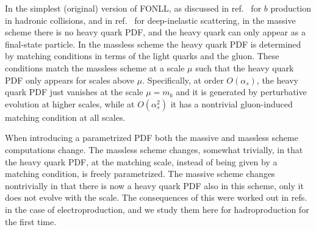 In the simplest (original) version of  FONLL, as discussed
in ref.~\cite{Cacciari:1998it} for $b$ production in hadronic
collisions, and in ref.~\cite{Forte:2010ta} for deep-inelastic
scattering, in the massive scheme there is no heavy quark PDF, and the
 heavy quark can only appear as a final-state particle. In the
 massless scheme the heavy quark PDF is determined by matching
 conditions in terms of the light quarks and the gluon. These
 conditions match the massless scheme at a scale $\mu$ such that the
 heavy quark PDF only appears for scales above $\mu$. Specifically,
 at order $O(\alpha_s)$, the heavy quark PDF just vanishes
 at the scale 
 $\mu=m_b$
 and it is
 generated by perturbative evolution at higher scales, while at
 $O(\alpha^2_s)$ it has a nontrivial gluon-induced matching condition
 at all scales.

 When introducing a parametrized PDF both the massive and massless
 scheme computations change. The massless scheme changes, somewhat
 trivially,
 in that the
 heavy quark PDF, at the matching scale, instead of being given by a
 matching condition,  is freely parametrized. The massive scheme
 changes nontrivially in that there is now a heavy quark PDF also in
 this scheme, 
only it does not evolve with the scale.  The
 consequences of this were worked out in
 refs.~\cite{Ball:2015tna,Ball:2015dpa} in the case of
 electroproduction, and we study them here for hadroproduction for the
 first time.


